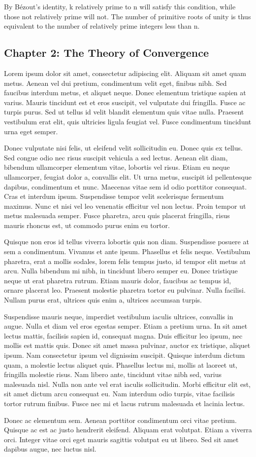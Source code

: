 \documentclass{article}
\newcounter{problem}
\begin{document}
By Bézout's identity, k relatively prime to n will satisfy this condition, while those not relatively prime will not. The number of primitive roots of unity is thus equivalent to the number of relatively prime integers less than n. \par


\subsection*{Chapter 2: The Theory of Convergence}
\setcounter{problem}{0}
Lorem ipsum dolor sit amet, consectetur adipiscing elit. Aliquam sit amet quam metus. Aenean vel dui pretium, condimentum velit eget, finibus nibh. Sed faucibus interdum metus, et aliquet neque. Donec elementum tristique sapien at varius. Mauris tincidunt est et eros suscipit, vel vulputate dui fringilla. Fusce ac turpis purus. Sed ut tellus id velit blandit elementum quis vitae nulla. Praesent vestibulum erat elit, quis ultricies ligula feugiat vel. Fusce condimentum tincidunt urna eget semper.

Donec vulputate nisi felis, ut eleifend velit sollicitudin eu. Donec quis ex tellus. Sed congue odio nec risus suscipit vehicula a sed lectus. Aenean elit diam, bibendum ullamcorper elementum vitae, lobortis vel risus. Etiam eu neque ullamcorper, feugiat dolor a, convallis elit. Ut urna metus, suscipit id pellentesque dapibus, condimentum et nunc. Maecenas vitae sem id odio porttitor consequat. Cras et interdum ipsum. Suspendisse tempor velit scelerisque fermentum maximus. Nunc et nisi vel leo venenatis efficitur vel non lectus. Proin tempor ut metus malesuada semper. Fusce pharetra, arcu quis placerat fringilla, risus mauris rhoncus est, ut commodo purus enim eu tortor.

Quisque non eros id tellus viverra lobortis quis non diam. Suspendisse posuere at sem a condimentum. Vivamus et ante ipsum. Phasellus et felis neque. Vestibulum pharetra, erat a mollis sodales, lorem felis tempus justo, id tempor elit metus at arcu. Nulla bibendum mi nibh, in tincidunt libero semper eu. Donec tristique neque ut erat pharetra rutrum. Etiam mauris dolor, faucibus ac tempus id, ornare placerat leo. Praesent molestie pharetra tortor eu pulvinar. Nulla facilisi. Nullam purus erat, ultrices quis enim a, ultrices accumsan turpis.

Suspendisse mauris neque, imperdiet vestibulum iaculis ultrices, convallis in augue. Nulla et diam vel eros egestas semper. Etiam a pretium urna. In sit amet lectus mattis, facilisis sapien id, consequat magna. Duis efficitur leo ipsum, nec mollis est mattis quis. Donec sit amet massa pulvinar, auctor ex tristique, aliquet ipsum. Nam consectetur ipsum vel dignissim suscipit. Quisque interdum dictum quam, a molestie lectus aliquet quis. Phasellus lectus mi, mollis at laoreet ut, fringilla molestie risus. Nam libero ante, tincidunt vitae nibh sed, varius malesuada nisl. Nulla non ante vel erat iaculis sollicitudin. Morbi efficitur elit est, sit amet dictum arcu consequat eu. Nam interdum odio turpis, vitae facilisis tortor rutrum finibus. Fusce nec mi et lacus rutrum malesuada et lacinia lectus.

Donec ac elementum sem. Aenean porttitor condimentum orci vitae pretium. Quisque ac est ac justo hendrerit eleifend. Aliquam erat volutpat. Etiam a viverra orci. Integer vitae orci eget mauris sagittis volutpat eu ut libero. Sed sit amet dapibus augue, nec luctus nisl.
\end{document}
